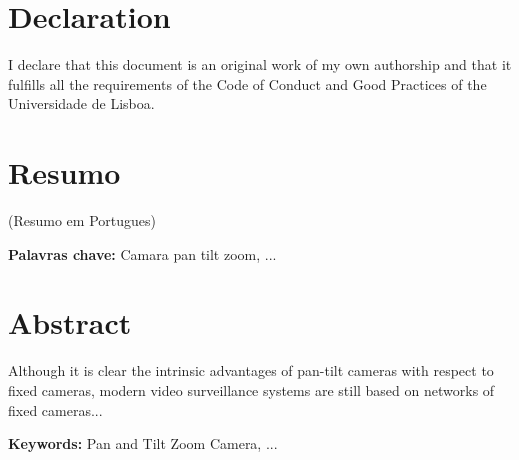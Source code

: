 
\chapter*{Declaration}

I declare that this document is an original work of my own authorship and that it fulfills all the
requirements of the Code of Conduct and Good Practices of the Universidade de Lisboa. 


%
%



\chapter*{Resumo}

(Resumo em Portugues)


\vspace{1cm}\noindent\textbf{Palavras chave:}
Camara pan tilt zoom, ...


\chapter*{Abstract}

Although it is clear the intrinsic advantages of pan-tilt cameras with respect to fixed cameras, modern video surveillance systems are still based on networks of fixed cameras...


\vspace{1cm}\noindent\textbf{Keywords:}
Pan and Tilt Zoom Camera, ...
